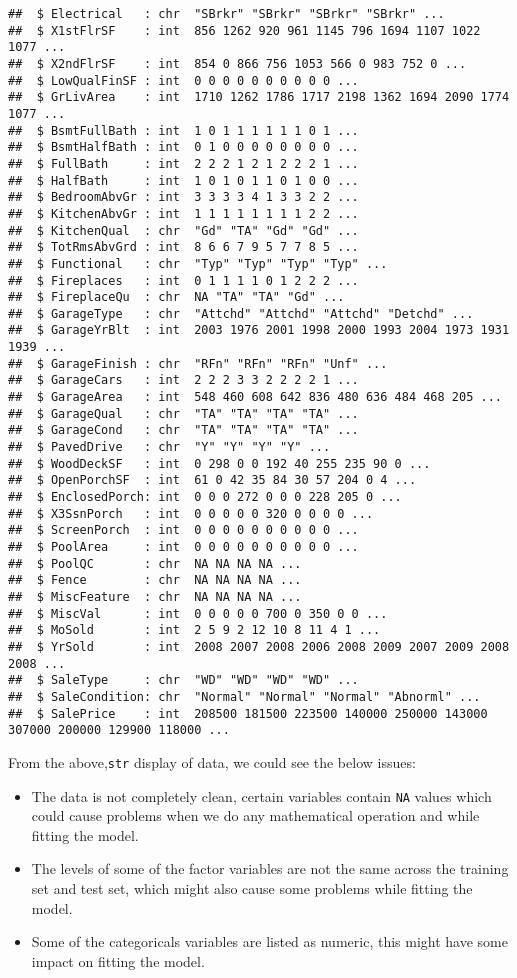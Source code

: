 \documentclass[]{article}
\providecommand{\tightlist}{%
  \setlength{\itemsep}{0pt}\setlength{\parskip}{0pt}}
\begin{document}
\begin{verbatim}
##  $ Electrical   : chr  "SBrkr" "SBrkr" "SBrkr" "SBrkr" ...
##  $ X1stFlrSF    : int  856 1262 920 961 1145 796 1694 1107 1022 1077 ...
##  $ X2ndFlrSF    : int  854 0 866 756 1053 566 0 983 752 0 ...
##  $ LowQualFinSF : int  0 0 0 0 0 0 0 0 0 0 ...
##  $ GrLivArea    : int  1710 1262 1786 1717 2198 1362 1694 2090 1774 1077 ...
##  $ BsmtFullBath : int  1 0 1 1 1 1 1 1 0 1 ...
##  $ BsmtHalfBath : int  0 1 0 0 0 0 0 0 0 0 ...
##  $ FullBath     : int  2 2 2 1 2 1 2 2 2 1 ...
##  $ HalfBath     : int  1 0 1 0 1 1 0 1 0 0 ...
##  $ BedroomAbvGr : int  3 3 3 3 4 1 3 3 2 2 ...
##  $ KitchenAbvGr : int  1 1 1 1 1 1 1 1 2 2 ...
##  $ KitchenQual  : chr  "Gd" "TA" "Gd" "Gd" ...
##  $ TotRmsAbvGrd : int  8 6 6 7 9 5 7 7 8 5 ...
##  $ Functional   : chr  "Typ" "Typ" "Typ" "Typ" ...
##  $ Fireplaces   : int  0 1 1 1 1 0 1 2 2 2 ...
##  $ FireplaceQu  : chr  NA "TA" "TA" "Gd" ...
##  $ GarageType   : chr  "Attchd" "Attchd" "Attchd" "Detchd" ...
##  $ GarageYrBlt  : int  2003 1976 2001 1998 2000 1993 2004 1973 1931 1939 ...
##  $ GarageFinish : chr  "RFn" "RFn" "RFn" "Unf" ...
##  $ GarageCars   : int  2 2 2 3 3 2 2 2 2 1 ...
##  $ GarageArea   : int  548 460 608 642 836 480 636 484 468 205 ...
##  $ GarageQual   : chr  "TA" "TA" "TA" "TA" ...
##  $ GarageCond   : chr  "TA" "TA" "TA" "TA" ...
##  $ PavedDrive   : chr  "Y" "Y" "Y" "Y" ...
##  $ WoodDeckSF   : int  0 298 0 0 192 40 255 235 90 0 ...
##  $ OpenPorchSF  : int  61 0 42 35 84 30 57 204 0 4 ...
##  $ EnclosedPorch: int  0 0 0 272 0 0 0 228 205 0 ...
##  $ X3SsnPorch   : int  0 0 0 0 0 320 0 0 0 0 ...
##  $ ScreenPorch  : int  0 0 0 0 0 0 0 0 0 0 ...
##  $ PoolArea     : int  0 0 0 0 0 0 0 0 0 0 ...
##  $ PoolQC       : chr  NA NA NA NA ...
##  $ Fence        : chr  NA NA NA NA ...
##  $ MiscFeature  : chr  NA NA NA NA ...
##  $ MiscVal      : int  0 0 0 0 0 700 0 350 0 0 ...
##  $ MoSold       : int  2 5 9 2 12 10 8 11 4 1 ...
##  $ YrSold       : int  2008 2007 2008 2006 2008 2009 2007 2009 2008 2008 ...
##  $ SaleType     : chr  "WD" "WD" "WD" "WD" ...
##  $ SaleCondition: chr  "Normal" "Normal" "Normal" "Abnorml" ...
##  $ SalePrice    : int  208500 181500 223500 140000 250000 143000 307000 200000 129900 118000 ...
\end{verbatim}

From the above,\texttt{str} display of data, we could see the below
issues:

\begin{itemize}
\tightlist
\item
  The data is not completely clean, certain variables contain
  \texttt{NA} values which could cause problems when we do any
  mathematical operation and while fitting the model.
\item
  The levels of some of the factor variables are not the same across the
  training set and test set, which might also cause some problems while
  fitting the model.
\item
  Some of the categoricals variables are listed as numeric, this might
  have some impact on fitting the model.
\end{itemize}
\end{document}
